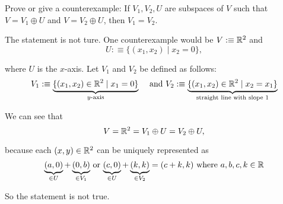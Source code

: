 

\setcounter{xrcscount}{22}
\begin{xrcs}
  Prove or give a counterexample: If $V_1, V_2, U$ are subspaces of $V$ such that $V=V_1 \oplus U$ and $V=V_2 \oplus U$, then $V_1 = V_2$.

  \begin{xsol}
    The statement is not ture. One counterexample would be $V :\equiv \mathbb{R}^2$ and
    \begin{equation}
      U :\equiv \{ (x_1, x_2) \mid x_2=0 \},
    \end{equation}

    where $U$ is the $x$-axis. Let $V_1$ and $V_2$ be defined as follows:
    \[
      V_1 :\equiv \underbrace{\{(x_1, x_2) \in \real^2 \mid x_1 = 0 \}}_{\text{$y$-axis}} \quad $ and $
      V_2 :\equiv \underbrace{\{ (x_1, x_2) \in \real^2 \mid x_2 = x_1 \}}_{\text{straight line with slope $1$}}
    \]

    We can see that
    \begin{equation}
      V=\mathbb{R}^2=V_1 \oplus U = V_2 \oplus U,
    \end{equation}

    because each $(x,y)\in \mathbb{R}^2$ can be uniquely represented as \begin{equation}
      \underbrace{(a,0)}_{\in U}+\underbrace{(0,b)}_{\in V_1}$ or $\underbrace{(c,0)}_{\in U}+\underbrace{(k,k)}_{\in V_2}=(c+k,k)$ where $a,b,c,k \in \real
    \end{equation}

    So the statement is not true.
  \end{xsol}
\end{xrcs}